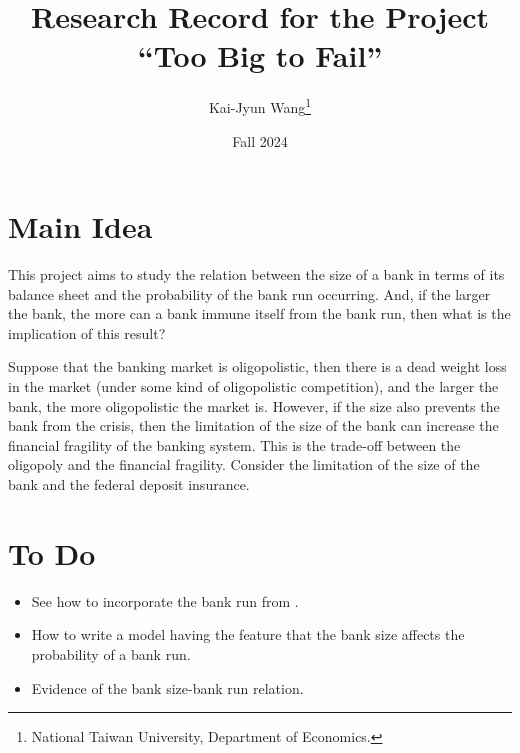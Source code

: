 \documentclass[a4paper, 12pt]{article}
\title{Research Record for the Project ``Too Big to Fail''}
\author{Kai-Jyun Wang\thanks{National Taiwan University, Department of Economics.}}
\date{Fall 2024}
\begin{document}
 
\maketitle

\section{Main Idea} 
This project aims to study the relation between the size of a 
bank in terms of its balance sheet and the probability of the 
bank run occurring. And, if the larger the bank, the more can 
a bank immune itself from the bank run, then what is the 
implication of this result? 

Suppose that the banking market is oligopolistic, then there 
is a dead weight loss in the market (under some kind of oligopolistic 
competition), and the larger the bank, the more oligopolistic the 
market is. However, if the size also prevents the bank from the 
crisis, then the limitation of the size of the bank can increase 
the financial fragility of the banking system. This is the 
trade-off between the oligopoly and the financial fragility. 
Consider the limitation of the size of the bank and the federal 
deposit insurance. 

\section{To Do}
\begin{itemize}
    \item See how to incorporate the bank run from \cite{diamond1983}.  
    \item How to write a model having the feature that the bank size affects 
    the probability of a bank run. 
    \item Evidence of the bank size-bank run relation.
\end{itemize}



\end{document}
